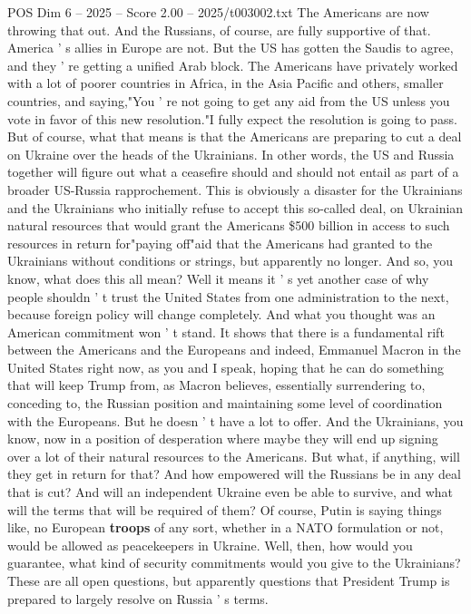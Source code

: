 \begin{textsample}{POS Dim 6 – 2025 – Score 2.00 – 2025/t003002.txt}
The Americans are now throwing that out.
And the Russians, of course, are fully supportive of that.
America ' s allies in Europe are not.
But the US has gotten the Saudis to agree, and they ' re getting a unified Arab block.
The Americans have privately worked with a lot of poorer countries in Africa, in the Asia Pacific and others, smaller countries, and saying,"You ' re not going to get any aid from the US unless you vote in favor of this new resolution."I fully expect the resolution is going to pass.
But of course, what that means is that the Americans are preparing to cut a deal on Ukraine over the heads of the Ukrainians.
In other words, the US and Russia together will figure out what a ceasefire should and should not entail as part of a broader US-Russia rapprochement.
This is obviously a disaster for the Ukrainians and the Ukrainians who initially refuse to accept this so-called deal, on Ukrainian natural resources that would grant the Americans \$500 billion in access to such resources in return for"paying off"aid that the Americans had granted to the Ukrainians without conditions or strings, but apparently no longer.
And so, you know, what does this all mean?
Well it means it ' s yet another case of why people shouldn ' t trust the United States from one administration to the next, because foreign policy will change completely.
And what you thought was an American commitment won ' t stand.
It shows that there is a fundamental rift between the Americans and the Europeans and indeed, Emmanuel Macron in the United States right now, as you and I speak, hoping that he can do something that will keep Trump from, as Macron believes, essentially surrendering to, conceding to, the Russian position and maintaining some level of coordination with the Europeans.
But he doesn ' t have a lot to offer.
And the Ukrainians, you know, now in a position of desperation where maybe they will end up signing over a lot of their natural resources to the Americans.
But what, if anything, will they get in return for that?
And how empowered will the Russians be in any deal that is cut?
And will an independent Ukraine even be able to survive, and what will the terms that will be required of them?
Of course, Putin is saying things like, no European \textbf{troops} of any sort, whether in a NATO formulation or not, would be allowed as peacekeepers in Ukraine.
Well, then, how would you guarantee, what kind of security commitments would you give to the Ukrainians?
These are all open questions, but apparently questions that President Trump is prepared to largely resolve on Russia ' s terms.

\end{textsample}
